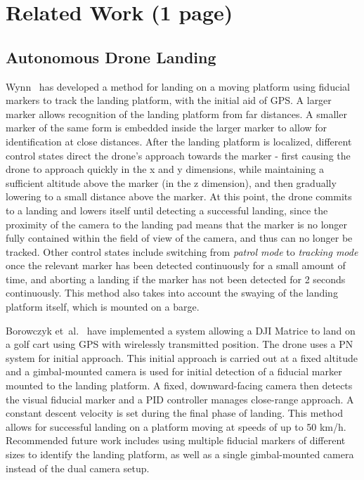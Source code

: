 \section{Related Work (1 page)}

\subsection{Autonomous Drone Landing}

Wynn~\cite{wynn} has developed a method for landing on a moving platform using fiducial markers to track the landing platform, with the initial aid of GPS. A larger marker allows recognition of the landing platform from far distances. A smaller marker of the same form is embedded inside the larger marker to allow for identification at close distances. After the landing platform is localized, different control states direct the drone's approach towards the marker - first causing the drone to approach quickly in the x and y dimensions, while maintaining a sufficient altitude above the marker (in the z dimension), and then gradually lowering to a small distance above the marker. At this point, the drone commits to a landing and lowers itself until detecting a successful landing, since the proximity of the camera to the landing pad means that the marker is no longer fully contained within the field of view of the camera, and thus can no longer be tracked. Other control states include switching from \textit{patrol mode} to \textit{tracking mode} once the relevant marker has been detected continuously for a small amount of time, and aborting a landing if the marker has not been detected for 2 seconds continuously. This method also takes into account the swaying of the landing platform itself, which is mounted on a barge. 

Borowczyk et~al.~\cite{high_velocity_landing} have implemented a system allowing a DJI Matrice to land on a golf cart using  {GPS} with wirelessly transmitted position. The drone uses a {PN} system for initial approach. This initial approach is carried out at a fixed altitude and a gimbal-mounted camera is used for initial detection of a fiducial marker mounted to the landing platform. A fixed, downward-facing camera then detects the visual fiducial marker and a  {PID} controller manages close-range approach. A constant descent velocity is set during the final phase of landing. This method allows for successful landing on a platform moving at speeds of up to 50 km/h. Recommended future work includes using multiple fiducial markers of different sizes to identify the landing platform, as well as a single gimbal-mounted camera instead of the dual camera setup.

